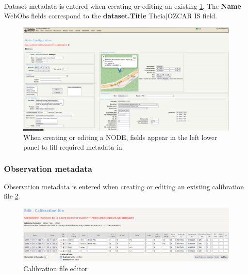 Dataset metadata is entered when creating or editing an existing  \ref{formNODE}. The \textbf{Name} WebObs  fields correspond to the \textbf{dataset.Title} Theia$\vert$OZCAR IS field.

\begin{figure}[!h]
	\centering
	\includegraphics[width=\textwidth, scale=0.4]{figures/theia/formNODE.png}
	\caption{When creating or editing a NODE, fields appear in the left lower panel to fill required metadata in.}
	\label{formNODE}
\end{figure}

\subsubsection{Observation metadata}

Observation metadata is entered when creating or editing an existing calibration file \ref{formCLB}.

\begin{figure}[!h]
	\centering
	\includegraphics[width=\textwidth]{figures/theia/calib_file_form.png}
	\caption{Calibration file editor}
	\label{formCLB}
\end{figure}

